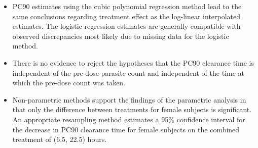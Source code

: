 \begin{itemize}
\item PC90 estimates using the cubic polynomial regression method lead to the same conclusions regarding treatment effect as the log-linear interpolated estimates. The logistic regression estimates are generally compatible with observed discrepancies most likely due to missing data for the logistic method.
\item There is no evidence to reject the hypotheses that the PC90 clearance time is independent of the pre-dose parasite count and independent of the time at which the pre-dose count was taken.
\item Non-parametric methods support the findings of the parametric analysis in that only the difference between treatments for female subjects is significant. An appropriate resampling method estimates a 95\% confidence interval for the decrease in PC90 clearance time for female subjects on the combined treatment of (6.5, 22.5) hours.
\end{itemize}